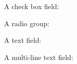 \documentclass{article}
\begin{document}
\null

A check box field: \checkboxfield

A radio group: 

A text field: \textfield

A multi-line text field: \textfield[multiline, depth=50bp]
\end{document}
